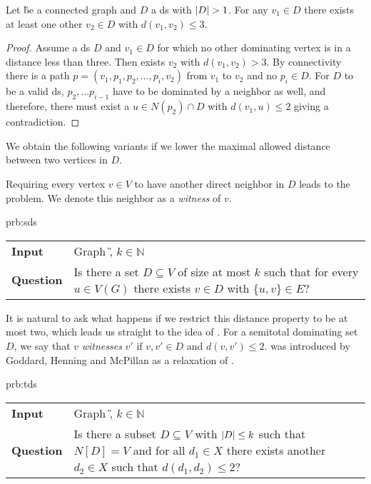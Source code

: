 \begin{fact}\label{fact:distance} Let \G be a connected graph and $D$ a ds with $\abs{D} > 1$. 
For any $v_1 \in D$ there exists at least one other $v_2 \in D$ with $d(v_1,v_2) \leq 3$.
\end{fact}
\begin{proof}

Assume a ds $D$ and $v_1 \in D$ for which no other dominating vertex is in a distance less than three.
Then exists $v_2$ with $d(v_1,v_2) > 3$. 
By connectivity there is a path $p = (v_1, p_1, p_2, ...,  p_i, v_2)$ from $v_1$ to $v_2$ and no $p_i \in D $. 
For $D$ to be a valid ds, $p_2,...p_{i-1}$ have to be dominated by a neighbor as well, and therefore, there must exist a $u \in N(p_2) \cap D$ with $d(v_1, u) \leq 2$ giving a contradiction.
\end{proof}
We obtain the following variants if we lower the maximal allowed distance between two vertices in $D$.

Requiring every vertex $v \in V$ to have another direct neighbor in $D$ leads to the \tdom problem. 
We denote this neighbor as a \textit{witness} of $v$.

\begin{prb}{prb:sds}
    \begin{tabularx}{1.0\textwidth}{>{\hsize=0.30\hsize}X>{\hsize=0.8\hsize}X}
        \textbf{Input} & Graph \G, $k \in \mathbb{N}$\\
        \textbf{Question} & Is there a set $D \subseteq V$ of size at most $k$ such that for every $u \in V(G)$ there exists $v \in D$ with $\{u,v\} \in E$? \\
    \end{tabularx}
\end{prb}

It is natural to ask what happens if we restrict this distance property to be at most two, which leads us straight to the idea of \sdomin.
For a semitotal dominating set $D$, we say that $v$ \emph{witnesses} $v'$ if $v, v' \in D$ and $d(v,v') \leq 2$.
\sdomin was introduced by Goddard, Henning and McPillan \cite{Goddard2014} as a relaxation of \tdomin. 

\begin{prb}{prb:tds}
    \begin{tabularx}{1.0\textwidth}{>{\hsize=0.30\hsize}X>{\hsize=0.8\hsize}X}
        \textbf{Input} & Graph \G, $k \in \mathbb{N}$\\
        \textbf{Question} & Is there a subset $D \subseteq V$ with $\abs{D} \leq k$ such that ${N[D] = V}$ and for all $d_1 \in X$ there exists another $d_2 \in X$ such that ${d(d_1, d_2) \leq 2}$?\\
    \end{tabularx}
\end{prb}


